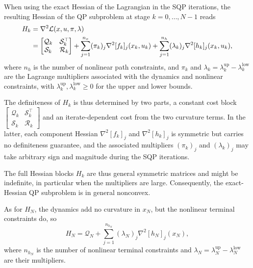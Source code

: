 \documentclass[class=scrbook, crop=false]{standalone}
\begin{document}
When using the exact Hessian of the Lagrangian in the \gls{SQP} iterations, 
the resulting Hessian of the \gls{QP} subproblem at stage $k = 0, \dots, N-1$ reads
\begin{align}
    H_k &= \nabla^2 \mathcal{L}(x, u, \pi, \lambda)  \notag \\
        &= \begin{bmatrix} \mathcal{Q}_k & \mathcal{S}_k^{\top} \\ \mathcal{S}_k & \mathcal{R}_k \end{bmatrix} + \sum_{j=1}^{n_x} (\pi_k)_j \nabla^2 [f_k]_j(x_k,u_k) + \sum_{j=1}^{n_h} (\lambda_k)_j \nabla^2 [h_k]_j(x_k,u_k),
\end{align}
where $n_h$ is the number of nonlinear path constraints,
and $\pi_k$ and $\lambda_k = \lambda_k^{\mathrm{up}} - \lambda_k^{\mathrm{low}}$ are the Lagrange multipliers associated 
with the dynamics and nonlinear constraints, with $\lambda_k^{\mathrm{up}}, \lambda_k^{\mathrm{low}} \ge 0$ for the upper and lower bounds.

The definiteness of $H_k$ is thus determined by two parts,
a constant cost block  $\left[\begin{smallmatrix}\mathcal{Q}_k & \mathcal{S}_k^{\top}\\ \mathcal{S}_k & \mathcal{R}_k\end{smallmatrix}\right]$
and an iterate-dependent cost from the two curvature terms.
In the latter, each component Hessian $\nabla^2[f_k]_j$ and $\nabla^2[h_k]_j$ is symmetric but carries no definiteness guarantee, 
and the associated multipliers $(\pi_k)_j$ and $(\lambda_k)_j$ may take arbitrary sign and magnitude during the \gls{SQP} iterations.

The full Hessian blocks $H_k$ are thus general symmetric matrices and might be indefinite, 
in particular when the multipliers are large.
Consequently, the exact-Hessian \gls{QP} subproblem is in general nonconvex.

As for $H_N$, the dynamics add no curvature in $x_N$,
but the nonlinear terminal constraints do, so
\begin{equation*}
    H_N = \mathcal{Q}_N + \sum_{j=1}^{n_{h_N}} (\lambda_N)_j \nabla^2 [h_N]_j(x_N),
\end{equation*}
where $n_{h_N}$ is the number of nonlinear terminal constraints 
and $\lambda_N = \lambda_N^{\mathrm{up}} - \lambda_N^{\mathrm{low}}$ are their multipliers.
\end{document}
